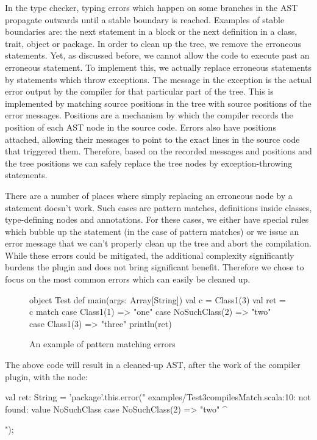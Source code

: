 In the type checker, typing errors which happen on some branches in the AST propagate outwards until a stable boundary is reached. Examples of stable boundaries are: the next statement in a block or the next definition in a class, trait, object or package. In order to clean up the tree, we remove the erroneous statements. Yet, as discussed before, we cannot allow the code to execute past an erroneous statement. To implement this, we actually replace erroneous statements by statements which throw exceptions. The message in the exception is the actual error output by the compiler for that particular part of the tree. This is implemented by matching source positions in the tree with source positions of the error messages. Positions are a mechanism by which the compiler records the position of each AST node in the source code. Errors also have positions attached, allowing their messages to point to the exact lines in the source code that triggered them. Therefore, based on the recorded messages and positions and the tree positions we can safely replace the tree nodes by exception-throwing statements.

There are a number of places where simply replacing an erroneous node by a statement doesn't work. Such cases are pattern matches, definitions inside classes, type-defining nodes and annotations. For these cases, we either have special rules which bubble up the statement (in the case of pattern matches) or we issue an error message that we can't properly clean up the tree and abort the compilation. While these errors could be mitigated, the additional complexity significantly burdens the plugin and does not bring significant benefit. Therefore we chose to focus on the most common errors which can easily be cleaned up.

\begin{figure}[h]
\begin{lstlisting-nobreak}
object Test {
   	def main(args: Array[String]) {
   		val c = Class1(3)
	   	val ret = c match {
	   		case Class1(1) => "one"
	   		case NoSuchClass(2) => "two"
	   		case Class1(3) => "three"
	   	}
	    println(ret)
	}
}
\end{lstlisting-nobreak}
\caption[pattern matching]
   {An example of pattern matching errors}
\end{figure}

The above code will result in a cleaned-up AST, after the work of the compiler plugin, with the node:

\begin{lstlisting-nobreak}
val ret: String = 'package'.this.error("
examples/Test3compilesMatch.scala:10: not found: value NoSuchClass
	   		case NoSuchClass(2) => "two"
                             ^

");
\end{lstlisting-nobreak}
